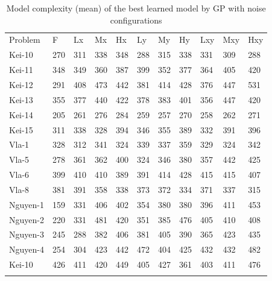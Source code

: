 \begin{center}
\begin{table}
\caption{Model complexity (mean) of the best learned model by GP with noise configurations}
\label{tab:size}       %
\begin{tabular}{lllllllllll}
\hline\noalign{\smallskip}
Problem & F & Lx & Mx & Hx & Ly & My & Hy & Lxy & Mxy & Hxy  \\
\noalign{\smallskip}\hline\noalign{\smallskip}
Kei-10 & 270 & 311 & 338 & 348 & 288 & 315	& 338 &	331	& 309 & 288 \\
Kei-11 & 348 & 349 & 360 & 387 & 399 & 352 & 377 & 364 & 405 & 420 \\
Kei-12 & 291 & 408 & 473 & 442 & 381 & 414 & 428 & 376 & 447 & 531 \\
Kei-13 & 355 & 377 & 440 & 422 & 378 & 383 & 401 & 356 & 447 & 420 \\
Kei-14 & 205 & 261 & 276 & 284 & 259 & 257 & 270 & 258 & 262 & 271 \\
Kei-15 & 311 & 338 & 328 & 394 & 346 & 355 & 389 & 332 & 391 & 396 \\
Vla-1 & 328 & 312 & 341 & 324 & 339 & 337 & 359 & 329 & 324 & 342 \\
Vla-5 & 278 & 361 & 362 & 400 & 324 & 346 & 380 & 357 & 442 & 425 \\
Vla-6 & 399 & 410 & 410 & 389 & 391 & 414 & 428 & 415 & 415 & 407 \\
Vla-8 & 381 & 391 & 358 & 338 & 373 & 372 & 334 & 371 & 337 & 315 \\
Nguyen-1 & 159 & 331 & 406 & 402 & 354 & 380 & 380 & 396 & 411 & 453 \\
Nguyen-2 & 220 & 331 & 481 & 420 & 351 & 385 & 476 & 405 & 410 & 408 \\
Nguyen-3 & 245 & 288 & 382 & 406 & 381 & 405 & 390 & 365 & 423 & 435 \\
Nguyen-4 & 254 & 304 & 423 & 442 & 472 & 404 & 425 & 432 & 432 & 482 \\
Kei-10 & 426 & 411 & 420 & 449 & 405 & 427 & 361 & 403 & 411 & 476 \\
\noalign{\smallskip}\hline
\end{tabular}
\end{table}
\end{center}

